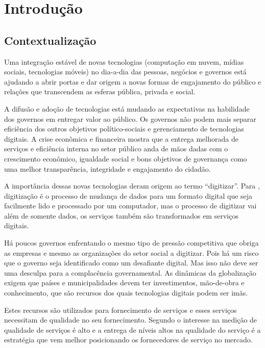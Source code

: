 \chapter[Introdução]{Introdução}
\section{Contextualização}
Uma integração estável de novas tecnologias (computação em nuvem, mídias sociais, tecnologias móveis) no dia-a-dia das pessoas, negócios e governos está ajudando a abrir portas e dar origem a novas formas de engajamento do público  e relações que transcendem as esferas pública, privada e social.\cite{oecd2014}

A difusão e adoção de tecnologias está mudando as expectativas na habilidade dos governos em entregar valor ao público. Os governos não podem mais separar eficiência dos outros objetivos político-sociais e gerenciamento de tecnologias digitais. A crise econômica e financeira mostra que a entrega melhorada de serviços e eficiência interna no setor público anda de mãos dadas com o crescimento econômico, igualdade social e bons objetivos de governança como uma melhor transparência, integridade e engajamento do cidadão.\cite{oecd2014}

A importância dessas novas tecnologias deram origem ao termo “digitizar”. Para \cite{steven2015}, digitização é o processo de mudança de dados para um formato digital que seja facilmente lido e processado por um computador, mas o processo de digitizar vai além de somente dados, os serviços também são transformados em serviços digitais.

Há poucos governos enfrentando o mesmo tipo de pressão competitiva que obriga as empresas e mesmo as organizações do setor social a digitizar. Pois há um risco que o governo seja identificado como um desafiante digital. Mas isso não deve ser uma desculpa para a complacência governamental. As dinâmicas da globalização exigem que países e municipalidades devem ter investimentos, mão-de-obra e conhecimento, que são recursos dos quais tecnologias digitais podem ser imãs. \cite{mckinsey2016}

Estes recursos são utilizados para fornecimento de serviços e esses serviços necessitam de qualidade no seu fornecimento. Segundo \cite{cronintaylor1992} o interesse na medição de qualidade de serviços é alto e a entrega de níveis altos na qualidade do serviço é a estratégia que vem melhor posicionando os fornecedores de serviço no mercado. 

